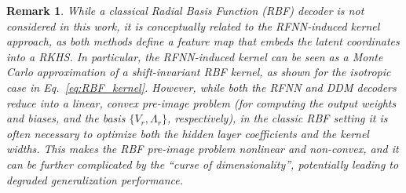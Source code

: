 \documentclass{article}
\newtheorem{remark}{Remark}
\begin{document}
\begin{remark}
While a classical Radial Basis Function (RBF) decoder is not considered in this work, it is conceptually related to the RFNN-induced kernel approach, as both methods define a feature map that embeds the latent coordinates into a RKHS. In particular, the RFNN-induced kernel can be seen as a Monte Carlo approximation of a shift-invariant RBF kernel, as shown for the isotropic case in Eq.~\eqref{eq:RBF_kernel}. However, while both the RFNN and DDM decoders reduce into a linear, convex pre-image problem (for computing the output weights and biases, and the basis $\{V_r, \Lambda_r\}$, respectively), in the classic RBF setting it is often necessary to optimize both the hidden layer coefficients and the kernel widths. This makes the RBF pre-image problem nonlinear and non-convex, and it can be further complicated by the ``curse of dimensionality'', potentially leading to degraded generalization performance.
\end{remark}
\end{document}
